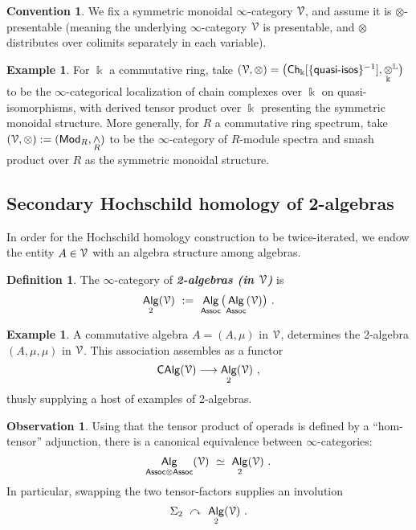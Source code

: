 \documentclass{amsart}
\theoremstyle{definition}
\newtheorem{definition}[theorem]{Definition}
\newtheorem{observation}[theorem]{Observation}
\newtheorem{example}[theorem]{Example}
\newtheorem*{conventions*}{Convention}
\theoremstyle{remark}
\DeclareMathOperator{\Alg}{\sf Alg}
\DeclareMathOperator{\Mod}{\sf Mod}
\DeclareMathOperator{\CAlg}{\sf CAlg}
\newcommand{\bit}[1]{\textbf{\textit{#1}}}
\newcommand{\lacts}{\curvearrowright}
\def\ot{\otimes}
\begin{document}
\begin{conventions*}
We fix a symmetric monoidal $\infty$-category $\mathcal V$, and assume it is $\ot$-presentable (meaning the underlying $\infty$-category $\mathcal V$ is presentable, and $\ot$ distributes over colimits separately in each variable).

\end{conventions*}

\begin{example}
For $\Bbbk$ a commutative ring, take $(\cV,\ot) = \bigl({\sf Ch}_\Bbbk[\{{\sf quasi\text{-}isos}\}^{-1}],\underset{\Bbbk}\otimes^{\LL}\bigr)$ to be the $\infty$-categorical localization of chain complexes over $\Bbbk$ on quasi-isomorphisms, with derived tensor product over $\Bbbk$ presenting the symmetric monoidal structure.
More generally, for $R$ a commutative ring spectrum, take $(\cV,\ot) := (\Mod_R,\underset{R}\wedge)$ to be the $\infty$-category of $R$-module spectra and smash product over $R$ as the symmetric monoidal structure.


\end{example}







\subsection{Secondary Hochschild homology of 2-algebras}

In order for the Hochschild homology construction to be twice-iterated, we endow the entity $A\in \mathcal V$ with an algebra structure among algebras.
\begin{definition}
\label{d4}
The $\infty$-category of \bit{2-algebras (in $\mathcal V$)} is
\[
\Alg_2(\cV)
~:=~
\Alg_{\sf Assoc}\bigl(
\Alg_{\sf Assoc}(\cV)
\bigr)
~.
\]

\end{definition}


\begin{example}
A commutative algebra $A = (A,\mu)$ in $\mathcal V$, 
determines the 2-algebra $(A,\mu,\mu)$ in $\mathcal V$.
This association assembles as a functor
\[
\CAlg(\cV)
\longrightarrow
\Alg_2(\cV)
~,
\]
thusly supplying a host of examples of 2-algebras.

\end{example}



\begin{observation}
\label{t46}
Using that the tensor product of operads is defined by a ``hom-tensor'' adjunction, there is a canonical equivalence between $\infty$-categories:
\[
\Alg_{{\sf Assoc}\ot {\sf Assoc}}(\cV)
~\simeq~
\Alg_2(\cV)
~.
\]
In particular, swapping the two tensor-factors supplies an involution 
\[
\Sigma_2
~\lacts~ 
\Alg_2(\cV)
~.
\]

\end{observation}
\end{document}
